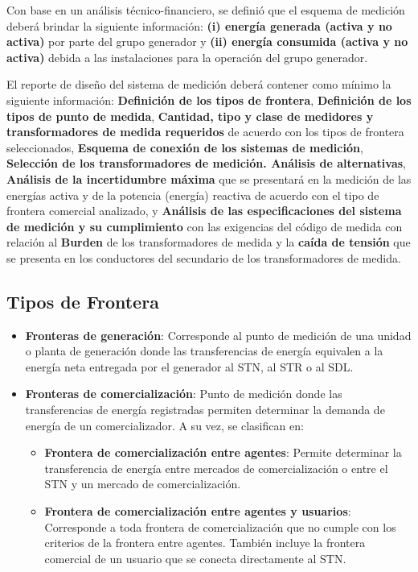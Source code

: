 Con base en un análisis técnico-financiero, se definió que el esquema de medición deberá brindar la siguiente información: \textbf{(i) energía generada (activa y no activa)} por parte del grupo generador y \textbf{(ii) energía consumida (activa y no activa)} debida a las instalaciones para la operación del grupo generador.

El reporte de diseño del sistema de medición deberá contener como mínimo la siguiente información: \textbf{Definición de los tipos de frontera}, \textbf{Definición de los tipos de punto de medida}, \textbf{Cantidad, tipo y clase de medidores y transformadores de medida requeridos} de acuerdo con los tipos de frontera seleccionados, \textbf{Esquema de conexión de los sistemas de medición}, \textbf{Selección de los transformadores de medición. Análisis de alternativas}, \textbf{Análisis de la incertidumbre máxima} que se presentará en la medición de las energías activa y de la potencia (energía) reactiva de acuerdo con el tipo de frontera comercial analizado, y \textbf{Análisis de las especificaciones del sistema de medición y su cumplimiento} con las exigencias del código de medida con relación al \textbf{Burden} de los transformadores de medida y la \textbf{caída de tensión} que se presenta en los conductores del secundario de los transformadores de medida.

\subsection{Tipos de Frontera} \label{subsec:tipos_frontera}
\begin{itemize}
    \item \textbf{Fronteras de generación}: Corresponde al punto de medición de una unidad o planta de generación donde las transferencias de energía equivalen a la energía neta entregada por el generador al STN, al STR o al SDL.
    \item \textbf{Fronteras de comercialización}: Punto de medición donde las transferencias de energía registradas permiten determinar la demanda de energía de un comercializador. A su vez, se clasifican en:
    \begin{itemize}
        \item \textbf{Frontera de comercialización entre agentes}: Permite determinar la transferencia de energía entre mercados de comercialización o entre el STN y un mercado de comercialización.
        \item \textbf{Frontera de comercialización entre agentes y usuarios}: Corresponde a toda frontera de comercialización que no cumple con los criterios de la frontera entre agentes. También incluye la frontera comercial de un usuario que se conecta directamente al STN.
    \end{itemize}
\end{itemize}

